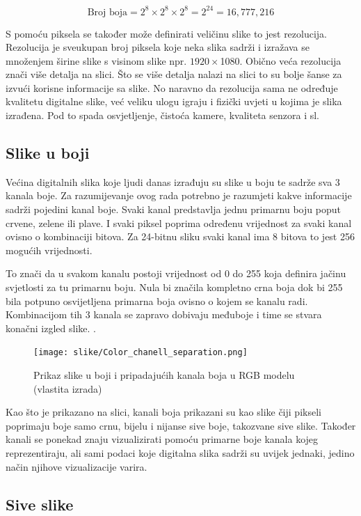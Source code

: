 \documentclass{foi}
\begin{document}
\[
\text{Broj boja} = 2^{8} \times 2^{8} \times 2^{8} = 2^{24} = 16,777,216
\]

S pomoću piksela se također može definirati veličinu slike to jest rezolucija. Rezolucija je sveukupan broj piksela koje neka slika sadrži i izražava se množenjem širine slike s visinom slike npr. $1920 \times $1080. Obično veća rezolucija znači više detalja na slici. Što se više detalja nalazi na slici to su bolje šanse za izvući korisne informacije sa slike. No naravno da rezolucija sama ne određuje kvalitetu digitalne slike, već veliku ulogu igraju i fizički uvjeti u kojima je slika izrađena. Pod to spada osvjetljenje, čistoća kamere, kvaliteta senzora i sl.

\subsection{Slike u boji}
Većina digitalnih slika koje ljudi danas izrađuju su slike u boju te sadrže sva 3 kanala boje. Za razumijevanje ovog rada potrebno je razumjeti kakve informacije sadrži pojedini kanal boje. Svaki kanal predstavlja jednu primarnu boju poput crvene, zelene ili plave. I svaki piksel poprima određenu vrijednost za svaki kanal ovisno o kombinaciji bitova. Za 24-bitnu sliku svaki kanal ima 8 bitova to jest 256 mogućih vrijednosti. 

To znači da u svakom kanalu postoji vrijednost od 0 do 255 koja definira jačinu svjetlosti za tu primarnu boju. Nula bi značila kompletno crna boja dok bi 255 bila potpuno osvijetljena primarna boja ovisno o kojem se kanalu radi. Kombinacijom tih 3 kanala se zapravo dobivaju međuboje i time se stvara konačni izgled slike. \cite{GrayscaleSlika}.

\begin{figure}[h!]
    \centering
    \texttt{[image: slike/Color\_chanell\_separation.png]}
    \caption{Prikaz slike u boji i pripadajućih kanala boja u RGB modelu (vlastita izrada)}
    \label{fig:channels}
\end{figure}

Kao što je prikazano na slici, kanali boja prikazani su kao slike čiji pikseli poprimaju boje samo crnu, bijelu i nijanse sive boje, takozvane sive slike. Također kanali se ponekad znaju vizualizirati pomoću primarne boje kanala kojeg reprezentiraju, ali sami podaci koje digitalna slika sadrži su uvijek jednaki, jedino način njihove vizualizacije varira. 

\subsection{Sive slike}
\end{document}
